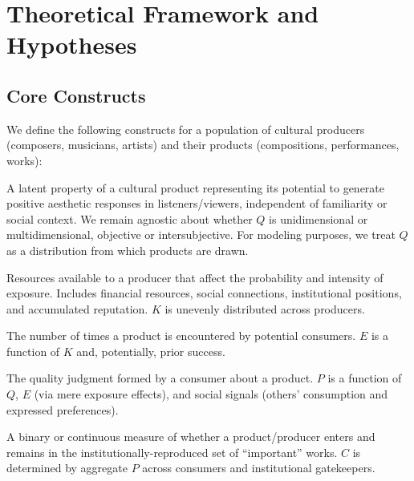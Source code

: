 \documentclass[11pt,a4paper]{article}
\begin{document}
\section{Theoretical Framework and Hypotheses}
\label{sec:theory}

\subsection{Core Constructs}

We define the following constructs for a population of cultural producers (composers, musicians, artists) and their products (compositions, performances, works):

\begin{description}[leftmargin=2em, style=nextline]
    \item[Intrinsic Quality ($Q$)] A latent property of a cultural product representing its potential to generate positive aesthetic responses in listeners/viewers, independent of familiarity or social context. We remain agnostic about whether $Q$ is unidimensional or multidimensional, objective or intersubjective. For modeling purposes, we treat $Q$ as a distribution from which products are drawn.
    
    \item[Capital ($K$)] Resources available to a producer that affect the probability and intensity of exposure. Includes financial resources, social connections, institutional positions, and accumulated reputation. $K$ is unevenly distributed across producers.
    
    \item[Exposure ($E$)] The number of times a product is encountered by potential consumers. $E$ is a function of $K$ and, potentially, prior success.
    
    \item[Perceived Quality ($P$)] The quality judgment formed by a consumer about a product. $P$ is a function of $Q$, $E$ (via mere exposure effects), and social signals (others' consumption and expressed preferences).
    
    \item[Canonical Status ($C$)] A binary or continuous measure of whether a product/producer enters and remains in the institutionally-reproduced set of ``important'' works. $C$ is determined by aggregate $P$ across consumers and institutional gatekeepers.
\end{description}
\end{document}
